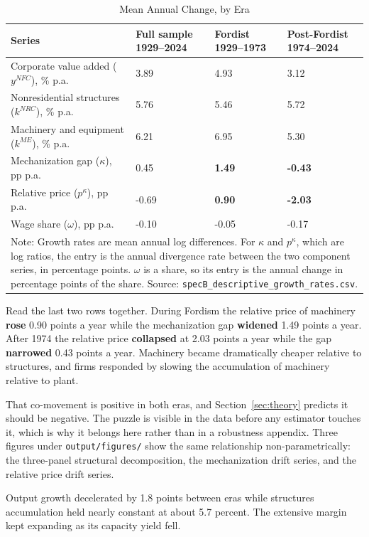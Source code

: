 \documentclass[11pt,a4paper]{article}
\begin{document}
\begin{table}[H]
\centering
\caption{Mean Annual Change, by Era}
\label{tab:descriptive}
\small
\begin{tabular}{p{7.0cm}p{2.6cm}p{2.6cm}p{2.6cm}}
\toprule
Series & Full sample 1929--2024 & Fordist 1929--1973 & Post-Fordist 1974--2024 \\
\midrule
Corporate value added ($y^{NFC}$), \% p.a. & 3.89 & 4.93 & 3.12 \\
Nonresidential structures ($k^{NRC}$), \% p.a. & 5.76 & 5.46 & 5.72 \\
Machinery and equipment ($k^{ME}$), \% p.a. & 6.21 & 6.95 & 5.30 \\
Mechanization gap ($\kappa$), pp p.a. & 0.45 & \textbf{1.49} & \textbf{-0.43} \\
Relative price ($p^{\kappa}$), pp p.a. & -0.69 & \textbf{0.90} & \textbf{-2.03} \\
Wage share ($\omega$), pp p.a. & -0.10 & -0.05 & -0.17 \\
\bottomrule
\multicolumn{4}{p{15.5cm}}{\footnotesize Note: Growth rates are mean annual log differences. For $\kappa$ and $p^{\kappa}$, which are log ratios, the entry is the annual divergence rate between the two component series, in percentage points. $\omega$ is a share, so its entry is the annual change in percentage points of the share. Source: \texttt{specB\_descriptive\_growth\_rates.csv}.}
\end{tabular}
\end{table}

Read the last two rows together. During Fordism the relative price of machinery \textbf{rose} 0.90 points a year while the mechanization gap \textbf{widened} 1.49 points a year. After 1974 the relative price \textbf{collapsed} at 2.03 points a year while the gap \textbf{narrowed} 0.43 points a year. Machinery became dramatically cheaper relative to structures, and firms responded by slowing the accumulation of machinery relative to plant.

That co-movement is positive in both eras, and Section~\ref{sec:theory} predicts it should be negative. The puzzle is visible in the data before any estimator touches it, which is why it belongs here rather than in a robustness appendix. Three figures under \texttt{output/figures/} show the same relationship non-parametrically: the three-panel structural decomposition, the mechanization drift series, and the relative price drift series.

Output growth decelerated by 1.8 points between eras while structures accumulation held nearly constant at about 5.7 percent. The extensive margin kept expanding as its capacity yield fell.
\end{document}
